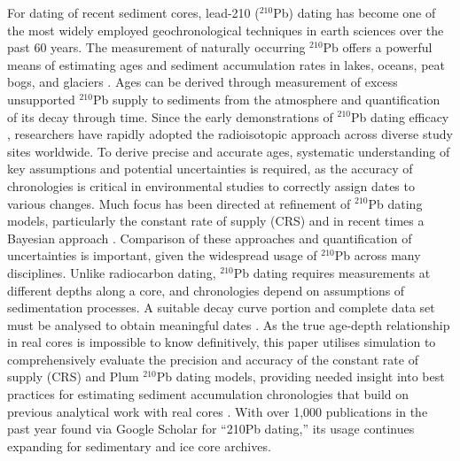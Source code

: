 \documentclass [10pt] {article}
\begin{document}
	For dating of recent sediment cores, lead-210 ($^{210}$Pb) dating has become one of the most widely employed geochronological techniques in earth sciences over the past 60 years. The measurement of naturally occurring $^{210}$Pb offers a powerful means of estimating ages and sediment accumulation rates in lakes, oceans, peat bogs, and glaciers \citep{Appleby1978,G_ggeler_1983}. Ages can be derived through measurement of excess unsupported $^{210}$Pb supply to sediments from the atmosphere and quantification of its decay through time. Since the early demonstrations of $^{210}$Pb dating efficacy \citep{Goldberg1963}, researchers have rapidly adopted the radioisotopic approach across diverse study sites worldwide. To derive precise and accurate ages, systematic understanding of key assumptions and potential uncertainties is required, as the accuracy of chronologies is critical in environmental studies to correctly assign dates to various changes. Much focus has been directed at refinement of $^{210}$Pb dating models, particularly the constant rate of supply (CRS) and in recent times a Bayesian approach \citep[Plum, ][]{Aquino2018}. Comparison of these approaches and quantification of uncertainties is important, given the widespread usage of $^{210}$Pb across many disciplines. Unlike radiocarbon dating, $^{210}$Pb dating requires measurements at different depths along a core, and chronologies depend on assumptions of sedimentation processes. A suitable decay curve portion and complete data set must be analysed to obtain meaningful dates \cite{Aquino2018}. As the true age-depth relationship in real cores is impossible to know definitively, this paper utilises simulation to comprehensively evaluate the precision and accuracy of the constant rate of supply (CRS) and Plum $^{210}$Pb dating models, providing needed insight into best practices for estimating sediment accumulation chronologies that build on previous analytical work with real cores \citep{Aquino2020}. With over 1,000 publications in the past year found via Google Scholar for ``210Pb dating,'' its usage continues expanding for sedimentary and ice core archives.
\end{document}
